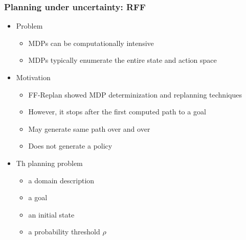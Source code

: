 \documentclass{beamer}
\let\origframetitle=\frametitle
\renewcommand\frametitle[1]{\origframetitle{\textbf{\large{\textrm{#1}}}}}
\begin{document}
\begin{frame}
  \frametitle{Planning under uncertainty: RFF}

  \begin{itemize}
    \item Problem
      \begin{itemize}
        \item MDPs can be computationally intensive
        \item MDPs typically enumerate the entire state and action space
      \end{itemize}
    \item Motivation
      \begin{itemize}
        \item FF-Replan showed MDP determinization and replanning techniques
        \item However, it stops after the first computed path to a goal
        \item May generate same path over and over
        \item Does not generate a policy
      \end{itemize}
    \item Th planning problem
      \begin{itemize}
        \item a domain description
        \item a goal
        \item an initial state
        \item a probability threshold $\rho$
      \end{itemize}
  \end{itemize}

\end{frame}
\end{document}
